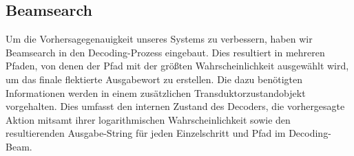 \documentclass[a4paper]{article}
\begin{document}
\subsection{Beamsearch}



Um die Vorhersagegenauigkeit unseres Systems zu verbessern, haben wir Beamsearch in den Decoding-Prozess eingebaut.
Dies resultiert in mehreren Pfaden, von denen der Pfad mit der größten Wahrscheinlichkeit ausgewählt wird, um das finale flektierte Ausgabewort zu erstellen.
Die dazu benötigten Informationen werden in einem zusätzlichen Transduktorzustandobjekt vorgehalten.
Dies umfasst den internen Zustand des Decoders, die vorhergesagte Aktion mitsamt ihrer logarithmischen Wahrscheinlichkeit sowie den resultierenden Ausgabe-String für jeden Einzelschritt und Pfad im Decoding-Beam.
\end{document}
